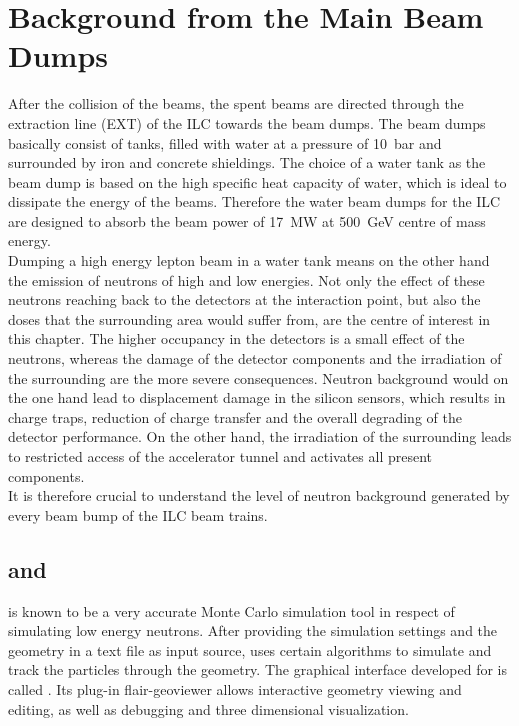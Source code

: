 \chapter{Background from the Main Beam Dumps}
\label{BeamDumps}
After the collision of the \positron\electron beams, the spent beams are directed through the extraction line (EXT) of the ILC towards the beam dumps. The beam dumps basically consist of tanks, filled with water at a pressure of \SI{10}{\bar} and surrounded by iron and concrete shieldings. The choice of a water tank as the beam dump is based on the high specific heat capacity of water, which is ideal to dissipate the energy of the beams. Therefore the water beam dumps for the ILC are designed to absorb the beam power of \SI{17}{\mega\watt} at \SI{500}{\GeV} centre of mass energy.\\
Dumping a high energy lepton beam in a water tank means on the other hand the emission of neutrons of high and low energies. Not only the effect of these neutrons reaching back to the detectors at the interaction point, but also the doses that the surrounding area would suffer from, are the centre of interest in this chapter. The higher occupancy in the detectors is a small effect of the neutrons, whereas the damage of the detector components and the irradiation of the surrounding are the more severe consequences. Neutron background would on the one hand lead to displacement damage in the silicon sensors, which results in charge traps, reduction of charge transfer and the overall degrading of the detector performance. On the other hand, the irradiation of the surrounding leads to restricted access of the accelerator tunnel and activates all present components.\\It is therefore crucial to understand the level of neutron background generated by every beam bump of the ILC beam trains.

\section{\fluka and \flair}
\label{BeamDumps:fluka}
\fluka is known to be a very accurate Monte Carlo simulation tool in respect of simulating low energy neutrons. After providing the simulation settings and the geometry in a text file as input source, \fluka uses certain algorithms to simulate and track the particles through the geometry.
The graphical interface developed for \fluka is called \flair. Its plug-in flair-geoviewer allows interactive geometry viewing and editing, as well as debugging and three dimensional visualization.

